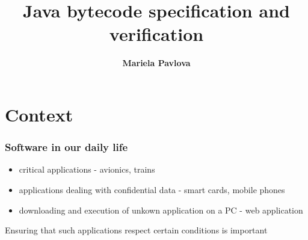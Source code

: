 \documentclass{beamer}
\title[Phd defense]{Java bytecode specification and verification}
\author[mariela.pavlova@sophia.inria.fr]{\textbf{Mariela Pavlova}}
\date[Phd defense]{}
\begin{document}
\begin{frame}
\titlepage
\end{frame}





\newcommand{\wpi}{\mbox{\rm\textit{wp}}}%
\newcommand{\Pred}{\mbox{\rm\texttt{Pred}}}
\newcommand{\program}{\mbox{\rm\texttt{P}}}%
\newcommand{\Method}{\mbox{\rm\texttt{Method}}}%
\newcommand{\methodd}{\mbox{\rm\textsf{meth}}}

%    



\section{Context}
\begin{frame}[shrink]
\frametitle{Software in our daily life}
  \begin{itemize}
     \item critical applications - avionics, trains
       \item applications dealing with confidential data - smart cards, mobile phones
        \item   downloading and execution of unkown application on a PC - web application  
\end{itemize}
 
  Ensuring that such applications respect certain conditions is important
\end{frame}
\end{document}
